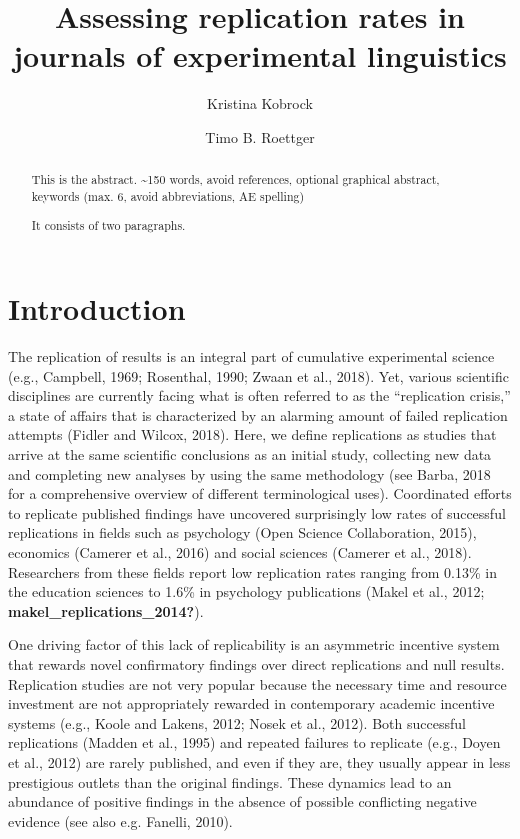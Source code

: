 \documentclass[]{elsarticle} %
\begin{document}
\begin{frontmatter}

  \title{Assessing replication rates in journals of experimental
linguistics}
    \author[University of Osnabrück]{Kristina Kobrock}
    \author[Universitetet i Oslo]{Timo B. Roettger}
  
      \address[University of Osnabrück]{Institute of Cognitive Science,
Wachsbleiche 27, 49090 Osnabrück}
    \address[Universitetet i Oslo]{Department of Linguistics and
Scandinavian Studies}
  
  \begin{abstract}
  This is the abstract. \textasciitilde150 words, avoid references,
  optional graphical abstract, keywords (max. 6, avoid abbreviations, AE
  spelling)

  It consists of two paragraphs.
  \end{abstract}
  
 \end{frontmatter}

\hypertarget{introduction}{%
\section{Introduction}\label{introduction}}

The replication of results is an integral part of cumulative
experimental science (e.g., Campbell, 1969; Rosenthal, 1990; Zwaan et
al., 2018). Yet, various scientific disciplines are currently facing
what is often referred to as the ``replication crisis,'' a state of
affairs that is characterized by an alarming amount of failed
replication attempts (Fidler and Wilcox, 2018). Here, we define
replications as studies that arrive at the same scientific conclusions
as an initial study, collecting new data and completing new analyses by
using the same methodology (see Barba, 2018 for a comprehensive overview
of different terminological uses). Coordinated efforts to replicate
published findings have uncovered surprisingly low rates of successful
replications in fields such as psychology (Open Science Collaboration,
2015), economics (Camerer et al., 2016) and social sciences (Camerer et
al., 2018). Researchers from these fields report low replication rates
ranging from 0.13\% in the education sciences to 1.6\% in psychology
publications (Makel et al., 2012; \textbf{makel\_replications\_2014?}).

One driving factor of this lack of replicability is an asymmetric
incentive system that rewards novel confirmatory findings over direct
replications and null results. Replication studies are not very popular
because the necessary time and resource investment are not appropriately
rewarded in contemporary academic incentive systems (e.g., Koole and
Lakens, 2012; Nosek et al., 2012). Both successful replications (Madden
et al., 1995) and repeated failures to replicate (e.g., Doyen et al.,
2012) are rarely published, and even if they are, they usually appear in
less prestigious outlets than the original findings. These dynamics lead
to an abundance of positive findings in the absence of possible
conflicting negative evidence (see also e.g. Fanelli, 2010).
\end{document}
